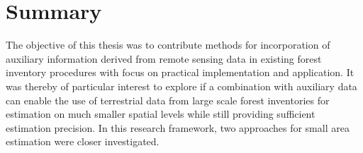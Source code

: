 \chapter*{Summary}
\label{chap:Summary}

The objective of this thesis was to contribute methods for incorporation of auxiliary information derived from remote sensing data in existing forest inventory procedures with focus on practical implementation and application. It was thereby of particular interest to explore if a combination with auxiliary data can enable the use of terrestrial data from large scale forest inventories for estimation on much smaller spatial levels while still providing sufficient estimation precision. In this research framework, two approaches for small area estimation were closer investigated.\par

